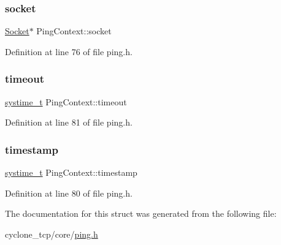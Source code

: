 \subsubsection{\texorpdfstring{socket}{socket}}
{\footnotesize\ttfamily \hyperlink{socket_8h_aa85acfb0fa336ef495e6ba87fb88fc48}{Socket}$\ast$ Ping\+Context\+::socket}



Definition at line 76 of file ping.\+h.

\mbox{\label{structPingContext_a54b3e386313823853f73dc5d6ec1758c}} 
\subsubsection{\texorpdfstring{timeout}{timeout}}
{\footnotesize\ttfamily \hyperlink{compiler__port_8h_ae3e32a98d431a02106616da3071832dd}{systime\+\_\+t} Ping\+Context\+::timeout}



Definition at line 81 of file ping.\+h.

\mbox{\label{structPingContext_a0da9c1f437ccff2b8084a2f8f76d2766}} 
\subsubsection{\texorpdfstring{timestamp}{timestamp}}
{\footnotesize\ttfamily \hyperlink{compiler__port_8h_ae3e32a98d431a02106616da3071832dd}{systime\+\_\+t} Ping\+Context\+::timestamp}



Definition at line 80 of file ping.\+h.



The documentation for this struct was generated from the following file\+:\begin{DoxyCompactItemize}
\item 
cyclone\+\_\+tcp/core/\hyperlink{ping_8h}{ping.\+h}\end{DoxyCompactItemize}
